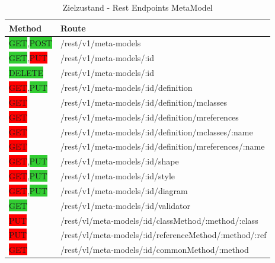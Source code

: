 \begin{table}[ht]
    \smallskip
    \centering
    \begin{tabular}{| l | l |}
    \hline
    \bf Method & \bf Route \\ \hline
    \colorbox{LimeGreen}{GET},\colorbox{LimeGreen}{POST} & /rest/v1/meta-models \\ \hline
    \colorbox{LimeGreen}{GET},\colorbox{red}{PUT} & /rest/v1/meta-models/:id \\ \hline
    \colorbox{LimeGreen}{DELETE} & /rest/v1/meta-models/:id \\ \hline
    \colorbox{red}{GET},\colorbox{LimeGreen}{PUT} & /rest/v1/meta-models/:id/definition \\ \hline
    \colorbox{red}{GET} & /rest/v1/meta-models/:id/definition/mclasses \\ \hline
    \colorbox{red}{GET} & /rest/v1/meta-models/:id/definition/mreferences \\ \hline
    \colorbox{red}{GET} & /rest/v1/meta-models/:id/definition/mclasses/:name \\ \hline
    \colorbox{red}{GET} & /rest/v1/meta-models/:id/definition/mreferences/:name \\ \hline
    \colorbox{red}{GET},\colorbox{LimeGreen}{PUT} & /rest/v1/meta-models/:id/shape \\ \hline
    \colorbox{red}{GET},\colorbox{LimeGreen}{PUT} & /rest/v1/meta-models/:id/style \\ \hline
    \colorbox{red}{GET},\colorbox{LimeGreen}{PUT} & /rest/v1/meta-models/:id/diagram \\ \hline
    \colorbox{LimeGreen}{GET} & /rest/v1/meta-models/:id/validator \\ \hline
    \colorbox{red}{PUT} & /rest/vl/meta-models/:id/classMethod/:method/:class \\ \hline
    \colorbox{red}{PUT} & /rest/vl/meta-models/:id/referenceMethod/:method/:ref \\ \hline
    \colorbox{red}{GET} & /rest/vl/meta-models/:id/commonMethod/:method \\ \hline
    \end{tabular}
    \caption{Zielzustand - Rest Endpoints MetaModel}
    \label{tab:ZETA_REST_META_NEW}
\end{table}


